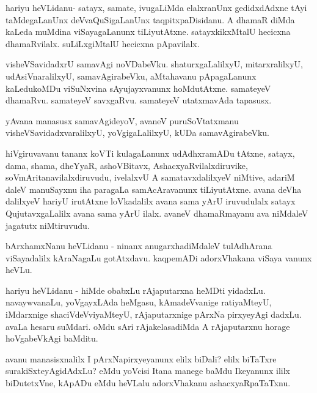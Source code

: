 \documentclass{article}
\begin{document}
\begin{mng}%
hariyu heVLidanu- satayx, samate, ivugaLiMda elalxranUnx
gedidxdAdxne tAyi taMdegaLanUnx deVvaQuSigaLanUnx taqpitxpaDisidanu. A dhamaR
diMda kaLeda muMdina viSayagaLanunx tiLiyutAtxne. satayxkikxMtalU hecicxna
dhamaRvilalx. suLiLxgiMtalU hecicxna pApavilalx.
\end{mng}

\begin{mng}%
visheVSavidadxrU samavAgi noVDabeVku. shaturxgaLalilxyU,
mitarxralilxyU, udAsiVnaralilxyU, samavAgirabeVku, aMtahavanu pApagaLanunx
kaLedukoMDu viSuNxvina sAyujayxvanunx hoMdutAtxne. samateyeV
dhamaRvu. samateyeV savxgaRvu. samateyeV utatxmavAda tapasusx.
\end{mng}

\begin{mng}%
yAvana manasusx samavAgideyoV, avaneV puruSoVtatxmanu
visheVSavidadxvaralilxyU, yoVgigaLalilxyU, kUDa samavAgirabeVku.
\end{mng}

\begin{mng}%
hiVgiruvavanu tananx koVTi kulagaLanunx udAdhxramADu
tAtxne, satayx, dama, shama, dheYyaR, ashoVBitavx, AshacxyaRvilalxdiruvike,
soVmAritanavilalxdiruvudu, ivelalxvU A samatavxdalilxyeV niMtive, adariM
daleV manuSayxnu iha paragaLa samAcAravanunx tiLiyutAtxne. avana deVha
dalilxyeV hariyU irutAtxne loVkadalilx avana sama yArU iruvudulalx
satayx QujutavxgaLalilx avana sama yArU ilalx. avaneV dhamaRmayanu ava
niMdaleV jagatutx niMtiruvudu.
\end{mng}

\begin{mng}%
bArxhamxNanu heVLidanu - ninanx anugarxhadiMdaleV tulAdhArana
viSayadalilx kAraNagaLu gotAtxdavu. kaqpemADi adorxVhakana viSaya
vanunx heVLu.
\end{mng}

\begin{mng}%
hariyu heVLidanu - hiMde obabxLu rAjaputarxna heMDti
yidadxLu. navaywvanaLu, yoVgayxLAda heMgasu, kAmadeVvanige ratiyaMteyU,
iMdarxnige shaciVdeVviyaMteyU, rAjaputarxnige pArxNa pirxyeyAgi
dadxLu. avaLa hesaru suMdari. oMdu sAri rAjakelasadiMda A rAjaputarxnu
horage hoVgabeVkAgi baMditu.
\end{mng}

\begin{mng}%
avanu manasisxnalilx I pArxNapirxyeyanunx elilx biDali?
elilx biTaTxre surakiSxteyAgidAdxLu? eMdu yoVcisi Itana manege baMdu
Ikeyanunx ililx biDutetxVne, kApADu eMdu heVLalu adorxVhakanu ashacxyaRpaTaTxnu.
\end{mng}
\end{document}
